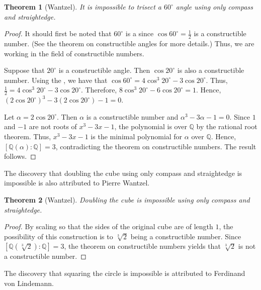 \documentclass[12pt]{article}
\newtheorem{thm}{Theorem}
\begin{document}
\begin{thm}[Wantzel]
It is impossible to trisect a $60^{\circ}$ angle using only compass and straightedge.
\end{thm}

\begin{proof}
It should first be noted that $60^{\circ}$ is a  since $\cos 60^{\circ}=\frac{1}{2}$ is a constructible number.  (See the theorem on constructible angles for more details.)  Thus, we are working in the field of constructible numbers.

Suppose that $20^{\circ}$ is a constructible angle.  Then $\cos 20^{\circ}$ is also a constructible number.  Using the , we have that $\cos 60^{\circ}=4\cos^3 20^{\circ}-3\cos 20^{\circ}$.  Thus, $\frac{1}{2}=4\cos^3 20^{\circ}-3\cos 20^{\circ}$.  Therefore, $8\cos^3 20^{\circ}-6\cos 20^{\circ}=1$.  Hence, $(2\cos 20^{\circ})^3-3(2\cos 20^{\circ})-1=0$.

Let $\alpha=2\cos 20^{\circ}$.  Then $\alpha$ is a constructible number and $\alpha^3-3\alpha-1=0$.  Since $1$ and $-1$ are not roots of $x^3-3x-1$, the polynomial is  over $\mathbb{Q}$ by the rational root theorem.  Thus, $x^3-3x-1$ is the minimal polynomial for $\alpha$ over $\mathbb{Q}$.  Hence, $[\mathbb{Q}(\alpha)\!:\!\mathbb{Q}]=3$, contradicting the theorem on constructible numbers.  The result follows.
\end{proof}

The discovery that doubling the cube using only compass and straightedge is impossible is also attributed to Pierre Wantzel.

\begin{thm}[Wantzel]
Doubling the cube is impossible using only compass and straightedge.
\end{thm}

\begin{proof}
By scaling so that the sides of the original cube are of length $1$, the possibility of this construction is  to $\sqrt[3]{2}$ being a constructible number.  Since $[\mathbb{Q}(\sqrt[3]{2})\!:\!\mathbb{Q}]=3$, the theorem on constructible numbers yields that $\sqrt[3]{2}$ is not a constructible number.
\end{proof}

The discovery that squaring the circle is impossible is attributed to Ferdinand von Lindemann.
\end{document}
